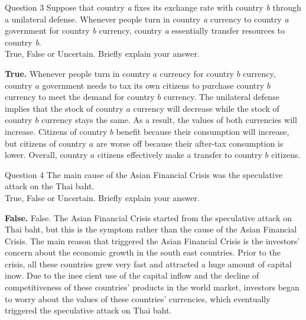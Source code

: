 \documentclass[a4paper]{article}
\newif\IfInSansMode
\numberwithin{equation}{section}
\numberwithin{figure}{section}
\begin{document}
	\begin{questionbox}{Question 3}
		Suppose that country \textit{a} fixes its exchange rate with country \textit{b} through a unilateral defense. Whenever people turn in country \textit{a} currency to country \textit{a} government for country \textit{b} currency, country \textit{a} essentially transfer resources to country \textit{b}.\\
		True, False or Uncertain. Briefly explain your answer.
		\begin{explanationbox}
			\textbf{True.} Whenever people turn in country \( a \) currency for country \( b \) currency, country \( a \) government needs to tax its own citizens to purchase country \( b \) currency to meet the demand for country \( b \) currency. The unilateral defense implies that the stock of country \( a \) currency will decrease while the stock of country \( b \) currency stays the same. As a result, the values of both currencies will increase. Citizens of country \( b \) benefit because their consumption will increase, but citizens of country \( a \) are worse off because their after-tax consumption is lower. Overall, country \( a \) citizens effectively make a transfer to country \( b \) citizens.
		\end{explanationbox}
	\end{questionbox}
	\begin{questionbox}{Question 4}
		The main cause of the Asian Financial Crisis was the speculative attack on the Thai baht.\\
		True, False or Uncertain. Briefly explain your answer.
		\begin{explanationbox}
			\textbf{False.} False. The Asian Financial Crisis started from the speculative attack on Thai baht, but this is the symptom rather than the cause of the Asian Financial Crisis. The main reason that triggered the Asian Financial Crisis is the investors' concern about the economic growth in the south east countries. Prior to the crisis, all these countries grew very fast and attracted a huge amount of capital inow. Due to the ine¢ cient use of the capital inflow and the decline of competitiveness of these countries' products in the world market, investors began to worry about the values of these countries' currencies, which eventually triggered the speculative attack on Thai baht.
		\end{explanationbox}
	\end{questionbox}
\end{document}
